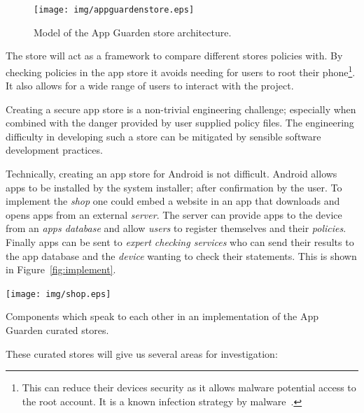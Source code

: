 \documentclass[a4paper]{article}
\begin{document}
\begin{figure}
  \centering
  \texttt{[image: img/appguardenstore.eps]}
  \caption{Model of the App Guarden store architecture.}
  \label{fig:appguardenstore}
\end{figure}

The store will act as a framework to compare different stores
policies with.  By checking policies in the app store it avoids
needing for users to root their phone\footnote{This can reduce their
devices security as it allows malware potential access to the root account.  It
is a known infection strategy by malware~\cite{Svajcer:2012wy}.}.
It also allows for a wide range of users to interact with the project. 

Creating a secure app store is a non-trivial engineering challenge; especially
when combined with the danger provided by user supplied policy files. The
engineering difficulty in developing such a store can be mitigated by sensible
software development practices. 

Technically, creating an app store for Android is not difficult.  Android allows
apps to be installed by the system installer; after confirmation by the user.
To implement the \emph{shop} one could embed a website in an app that downloads and
opens apps from an external \emph{server}.  The server can provide apps to the
device from an \emph{apps database} and allow \emph{users} to register
themselves and their \emph{policies}.  Finally apps can be sent to \emph{expert
checking services} who can send their results to the app database and the
\emph{device} wanting to check their statements.  This is shown in
Figure~\ref{fig:implement}.

\begin{marginfigure}
  \texttt{[image: img/shop.eps]}
  \caption{Components which speak to each other in an implementation of the App
  Guarden curated stores.}
  \label{fig:implement}
\end{marginfigure}

These curated stores will give us several areas for investigation:
\end{document}
